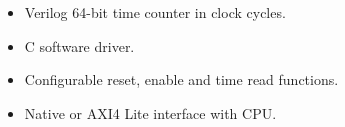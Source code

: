 \begin{itemize}
\item Verilog 64-bit time counter in clock cycles.
\item C software driver.
\item Configurable reset, enable and time read functions.
\item Native or AXI4 Lite interface with CPU.
\end{itemize}
